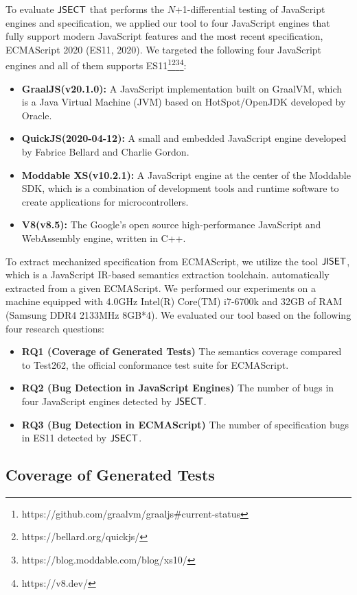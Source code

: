 To evaluate $\text{\sf JSECT}$ that performs the $N$+1-differential testing of JavaScript
engines and specification, we applied our tool to four JavaScript engines that
fully support modern JavaScript features and the most recent specification,
ECMAScript 2020 (ES11, 2020).  We targeted the following four JavaScript
engines and all of them supports
ES11\footnote{https://github.com/graalvm/graaljs\#current-status}\footnote{https://bellard.org/quickjs/}\footnote{https://blog.moddable.com/blog/xs10/}\footnote{https://v8.dev/}:
\begin{itemize}
  \item \textbf{GraalJS(v20.1.0):} A JavaScript implementation built on
    GraalVM\cite{graaljs}, which is a Java Virtual Machine (JVM) based on
    HotSpot/OpenJDK developed by Oracle.
  \item \textbf{QuickJS(2020-04-12):} A small and embedded JavaScript engine developed by
    Fabrice Bellard and Charlie Gordon\cite{qjs}.
  \item \textbf{Moddable XS(v10.2.1):} A JavaScript engine at the center of the Moddable
    SDK\cite{xs}, which is a combination of development tools and runtime
    software to create applications for microcontrollers.
  \item \textbf{V8(v8.5):} The Google's open source high-performance JavaScript and
    WebAssembly engine\cite{v8}, written in C++.
\end{itemize}
To extract mechanized specification from ECMAScript, we utilize the tool
$\text{\sf JISET}$, which is a JavaScript IR-based semantics extraction toolchain.
automatically extracted from a given ECMAScript.  We performed our experiments
on a machine equipped with 4.0GHz Intel(R) Core(TM) i7-6700k and 32GB of RAM
(Samsung DDR4 2133MHz 8GB*4).  We evaluated our tool based on the following four
research questions:
\begin{itemize}
  \item {\bf RQ1 (Coverage of Generated Tests)} The semantics coverage compared
    to Test262, the official conformance test suite for ECMAScript.
  \item {\bf RQ2 (Bug Detection in JavaScript Engines)} The number of bugs in
    four JavaScript engines detected by $\text{\sf JSECT}$.
  \item {\bf RQ3 (Bug Detection in ECMAScript)} The number of specification bugs
    in ES11 detected by $\text{\sf JSECT}$.
\end{itemize}


\subsection{Coverage of Generated Tests}


